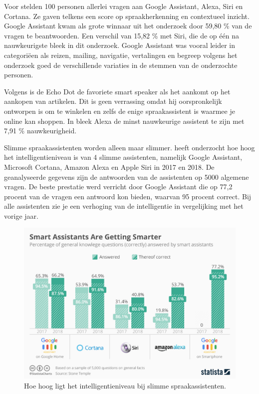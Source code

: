 Voor \textcite{Tulshan2019} stelden 100 personen allerlei vragen aan Google Assistant, Alexa, Siri en Cortana. Ze gaven telkens een score op spraakherkenning en contextueel inzicht. Google Assistant kwam als grote winnaar uit het onderzoek door 59,80 \% van de vragen te beantwoorden. Een verschil van 15,82 \% met Siri, die de op één na nauwkeurigste bleek in dit onderzoek. Google Assistant was vooral leider in categoriëen als reizen, mailing, navigatie, vertalingen en begreep volgens het onderzoek goed de verschillende variaties in de stemmen van de onderzochte personen.

Volgens \textcite{Lopez2018} is de Echo Dot de favoriete smart speaker als het aankomt op het aankopen van artikelen. Dit is geen verrassing omdat hij oorspronkelijk ontworpen is om te winkelen en zelfs de enige spraakassistent is waarmee je online kan shoppen. In \textcite{Tulshan2019} bleek Alexa de minst nauwkeurige assistent te zijn met 7,91 \% nauwkeurigheid.

Slimme spraakassistenten worden alleen maar slimmer. \textcite{Brandt2018} heeft onderzocht hoe hoog het intelligentieniveau is van 4 slimme assistenten, namelijk Google Assistant, Microsoft Cortana, Amazon Alexa en Apple Siri in 2017 en 2018. De geanalyseerde gegevens zijn de antwoorden van de assistenten op 5000 algemene vragen. De beste prestatie werd verricht door Google Assistant die op 77,2 procent van de vragen een antwoord kon bieden, waarvan 95 procent correct. Bij alle assistenten zie je een verhoging van de intelligentie in vergelijking met het vorige jaar.

\begin{figure}[h]
    \centering
    \includegraphics[width=0.9\linewidth]{img/SmartAssistantsAreGettingSmarter}
    \caption{Hoe hoog ligt het intelligentieniveau bij slimme spraakassistenten. \autocite{Brandt2018}}
    \label{fig:smartassistantsaregettingsmarter}
\end{figure}

